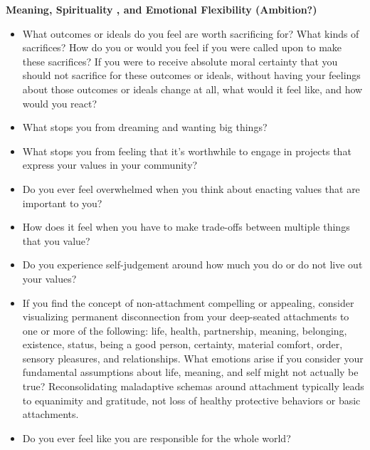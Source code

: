 \documentclass[12pt,letterpaper]{article}
\begin{document}
\noindent \textbf{Meaning, Spirituality , and Emotional Flexibility (Ambition?)}
\begin{itemize}
    \item What outcomes or ideals do you feel are worth sacrificing for? What kinds of sacrifices? How do you or would you feel if you were called upon to make these sacrifices? If you were to receive absolute moral certainty that you should not sacrifice for these outcomes or ideals, without having your feelings about those outcomes or ideals change at all, what would it feel like, and how would you react?
    \item What stops you from dreaming and wanting big things?
    \item What stops you from feeling that it's worthwhile to engage in projects that express your values in your community?
    \item Do you ever feel overwhelmed when you think about enacting values that are important to you?
    \item How does it feel when you have to make trade-offs between multiple things that you value?
    \item Do you experience self-judgement around how much you do or do not live out your values?
    \item If you find the concept of non-attachment compelling or appealing, consider visualizing permanent disconnection from your deep-seated attachments to one or more of the following: life, health, partnership, meaning, belonging, existence, status, being a good person, certainty, material comfort, order, sensory pleasures, and relationships. What emotions arise if you consider your fundamental assumptions about life, meaning, and self might not actually be true? Reconsolidating maladaptive schemas around attachment typically leads to equanimity and gratitude, not loss of healthy protective behaviors or basic attachments.
    \item Do you ever feel like you are responsible for the whole world?
\end{itemize}
\end{document}
